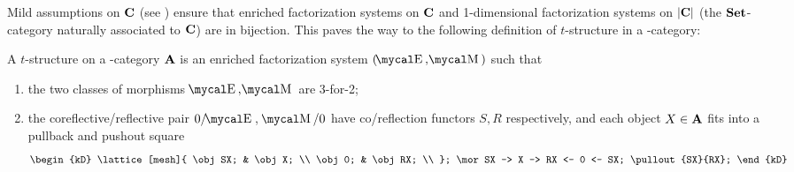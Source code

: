 Mild assumptions on $\textbf{C}$ (see \cite{Riehl2014}) ensure that enriched factorization systems on $\textbf{C}$ and 1\hyp{}dimensional factorization systems on $|\textbf{C}|$ (the $\textbf{Set}$\hyp{}category naturally associated to $\textbf{C}$) are in bijection. This paves the way to the following definition of $t$\hyp{}structure in a \hyp{}category:
\begin{definition}
A $t$\hyp{}structure on a \dg\hyp{}category $\textbf{A}$ is an enriched factorization system $(\EE,\MM)$ such that
\begin{enumerate}
\item the two classes of morphisms $\EE,\MM$ are 3\hyp{}for\hyp{}2;
\item the coreflective\fshyp{}reflective pair $0/\EE$, $\MM/0$ have co\fshyp{}reflection functors $S,R$ respectively, and each object $X\in\textbf{A}$ fits into a pullback and pushout square
\[
\begin{kD}
\lattice[mesh]{
\obj SX; & \obj X; \\
\obj 0; & \obj RX; \\	
};
\mor SX -> X -> RX <- 0 <- SX;
\pullout{SX}{RX};
\end{kD}
\]
\end{enumerate}
\end{definition}
